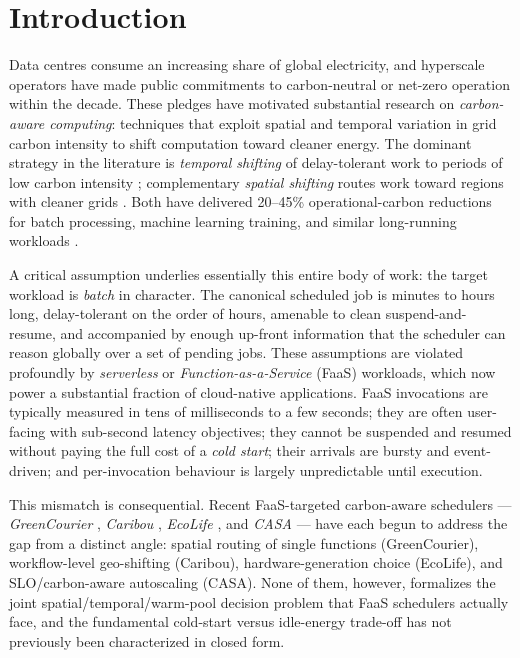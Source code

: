 \section{Introduction}
\label{sec:introduction}

Data centres consume an increasing share of global electricity, and
hyperscale operators have made public commitments to carbon-neutral
or net-zero operation within the decade. These pledges have motivated
substantial research on \emph{carbon-aware computing}: techniques
that exploit spatial and temporal variation in grid carbon intensity
to shift computation toward cleaner energy. The dominant strategy in
the literature is \emph{temporal shifting} of delay-tolerant work to
periods of low carbon intensity \citep{wiesner2021lets}; complementary
\emph{spatial shifting} routes work toward regions with cleaner grids
\citep{sukprasert2023quantifying,radovanovic2023google}. Both have delivered
20--45\% operational-carbon reductions for batch processing, machine
learning training, and similar long-running workloads
\citep{hanafy2023carbonscaler,sukprasert2023quantifying}.

A critical assumption underlies essentially this entire body of work:
the target workload is \emph{batch} in character. The canonical
scheduled job is minutes to hours long, delay-tolerant on the order
of hours, amenable to clean suspend-and-resume, and accompanied by
enough up-front information that the scheduler can reason globally
over a set of pending jobs. These assumptions are violated profoundly
by \emph{serverless} or \emph{Function-as-a-Service} (FaaS) workloads,
which now power a substantial fraction of cloud-native applications.
FaaS invocations are typically measured in tens of milliseconds to a
few seconds; they are often user-facing with sub-second latency
objectives; they cannot be suspended and resumed without paying the
full cost of a \emph{cold start}; their arrivals are bursty and
event-driven; and per-invocation behaviour is largely unpredictable
until execution.

This mismatch is consequential. Recent FaaS-targeted carbon-aware
schedulers --- \emph{GreenCourier} \citep{chadha2023greencourier},
\emph{Caribou} \citep{gsteiger2024caribou}, \emph{EcoLife}
\citep{jiang2024ecolife}, and \emph{CASA} \citep{qi2024casa} --- have
each begun to address the gap from a distinct angle: spatial routing of
single functions (GreenCourier), workflow-level geo-shifting
(Caribou), hardware-generation choice (EcoLife), and SLO/carbon-aware
autoscaling (CASA). None of them, however, formalizes the joint
spatial/temporal/warm-pool decision problem that FaaS schedulers
actually face, and the fundamental cold-start versus idle-energy
trade-off has not previously been characterized in closed form.

